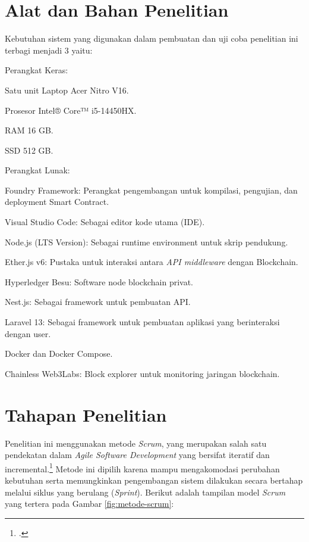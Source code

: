 	\section{Alat dan Bahan Penelitian}
	
	Kebutuhan sistem yang digunakan dalam pembuatan dan uji coba penelitian ini terbagi menjadi 3 yaitu:
	\begin{secenumerate}
		\item Perangkat Keras:
		\begin{subsecenumerate}
			\item Satu unit Laptop Acer Nitro V16.
			\item Prosesor Intel® Core™ i5-14450HX.
			\item RAM 16 GB.
			\item SSD 512 GB.
		\end{subsecenumerate}
		\item Perangkat Lunak:
		\begin{subsecenumerate}
			\item Foundry Framework: Perangkat pengembangan untuk kompilasi, pengujian, dan deployment Smart Contract.
			\item Visual Studio Code: Sebagai editor kode utama (IDE).
			\item Node.js (LTS Version): Sebagai runtime environment untuk skrip pendukung.
			\item Ether.js v6: Pustaka untuk interaksi antara \textit{API middleware} dengan Blockchain.
			\item Hyperledger Besu: Software node blockchain privat.
			\item Nest.js: Sebagai framework untuk pembuatan API.
			\item Laravel 13: Sebagai framework untuk pembuatan aplikasi yang berinteraksi dengan user.
			\item Docker dan Docker Compose.
			\item Chainless Web3Labs: Block explorer untuk monitoring jaringan blockchain.
		\end{subsecenumerate}
	\end{secenumerate}
	
	\section{Tahapan Penelitian}
	Penelitian ini menggunakan metode \textit{Scrum}, yang merupakan salah satu pendekatan dalam \textit{Agile Software Development} yang bersifat iteratif dan incremental.\footcite{Hema2020} Metode ini dipilih karena mampu mengakomodasi perubahan kebutuhan serta memungkinkan pengembangan sistem dilakukan secara bertahap melalui siklus yang berulang (\textit{Sprint}). Berikut adalah tampilan model \textit{Scrum} yang tertera pada Gambar \ref{fig:metode-scrum}:
	

